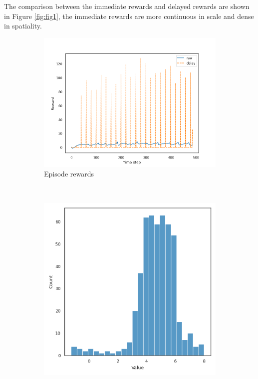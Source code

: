 The comparison between the immediate rewards and delayed rewards are shown in Figure \ref{fig:fig1}, the immediate rewards are more continuous in scale and dense in spatiality.
\begin{figure}[H]
    \centering
    \begin{subfigure}{0.33\textwidth}
        \includegraphics[width=\textwidth]{assets/delay_mode-constant-delay-20_0_delayed.png}
        \caption{Episode rewards}
    \end{subfigure}
    ~
    \begin{subfigure}{0.31\textwidth}
        \includegraphics[width=\textwidth]{assets/delay_mode-constant-delay-20_distribution_raw_0_delayed.png}

\end{subfigure}
\end{figure}
